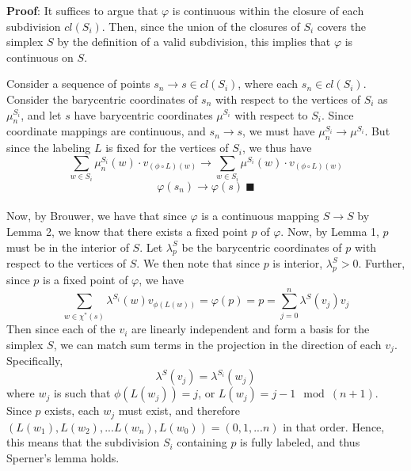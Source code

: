\documentclass[10pt,letter]{article}
\begin{document}
\textbf{Proof}: It suffices to argue that $\varphi$ is continuous within the closure of each subdivision $cl(S_i)$. Then, since the union of the closures of $S_i$ covers the simplex $S$ by the definition of a valid subdivision, this implies that $\varphi$ is continuous on $S$.

Consider a sequence of points $s_n \to s \in cl(S_i)$, where each $s_n \in cl(S_i)$. Consider the barycentric coordinates of $s_n$ with respect to the vertices of $S_i$ as $\mu_n^{S_i}$, and let $s$ have barycentric coordinates $\mu^{S_i}$ with respect to $S_i$. Since coordinate mappings are continuous, and $s_n \to s$, we must have $\mu_n^{S_i} \to \mu^{S_i}$. But since the labeling $L$ is fixed for the vertices of $S_i$, we thus have \[ \sum_{w \in S_i} \mu_n^{S_i}(w) \cdot v_{(\phi\circ L)(w)} \to \sum_{w \in S_i} \mu^{S_i}(w) \cdot v_{(\phi\circ L)(w)} \]  \[ \varphi(s_n) \to \varphi(s) \ \blacksquare\] \\

Now, by Brouwer, we have that since $\varphi$ is a continuous mapping $S \to S$ by Lemma 2, we know that there exists a fixed point $p$ of $\varphi$. Now, by Lemma 1, $p$ must be in the interior of $S$. Let $\lambda^S_p$ be the barycentric coordinates of $p$ with respect to the vertices of $S$. We then note that since $p$ is interior, $\lambda^S_p > 0$. Further, since $p$ is a fixed point of $\varphi$, we have
\[  \sum_{w \in \chi^*(s) } \lambda^{S_i}(w) v_{\phi(L(w))} = \varphi(p) = p = \sum_{j = 0}^n \lambda^S(v_j) v_j \]
Then since each of the $v_i$ are linearly independent and form a basis for the simplex $S$, we can match sum terms in the projection in the direction of each $v_j$. Specifically,
\[ \lambda^S(v_j) = \lambda^{S_i}(w_j)  \]
where $w_j$ is such that $\phi(L(w_j)) = j$, or $L(w_j) = j-1 \mod (n+1)$. Since $p$ exists, each $w_j$ must exist, and therefore $(L(w_1), L(w_2), ... L(w_n), L(w_0)) = (0, 1, ... n)$ in that order. Hence, this means that the subdivision $S_i$ containing $p$ is fully labeled, and thus Sperner's lemma holds.
\end{document}
